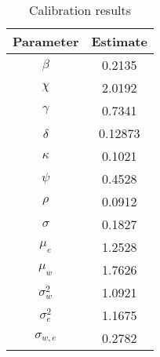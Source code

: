 \begin{table}[H]
\centering
\caption{Calibration results} 
\label{tab:CalibrationResults}
\begin{tabular}{cc}
  \hline
Parameter & Estimate \\ 
  \hline
$\beta$ & 0.2135 \\ 
  $\chi$ & 2.0192 \\ 
  $\gamma$ & 0.7341 \\ 
  $\delta$ & 0.12873 \\ 
  $\kappa$ & 0.1021 \\ 
  $\psi$ & 0.4528 \\ 
  $\rho$ & 0.0912 \\ 
  $\sigma$ & 0.1827 \\ 
  $\mu_e$ & 1.2528 \\ 
  $\mu_w$ & 1.7626 \\ 
  $\sigma_w^2$ & 1.0921 \\ 
  $\sigma_e^2$ & 1.1675 \\ 
  $\sigma_{w,e}$ & 0.2782 \\ 
   \hline
\end{tabular}
\end{table}

